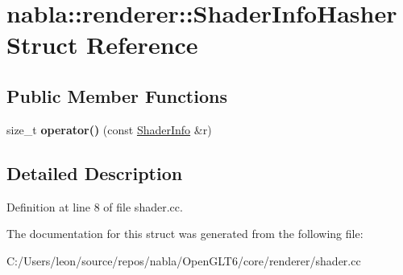 \hypertarget{structnabla_1_1renderer_1_1_shader_info_hasher}{}\section{nabla\+::renderer\+::Shader\+Info\+Hasher Struct Reference}
\label{structnabla_1_1renderer_1_1_shader_info_hasher}
\subsection*{Public Member Functions}
\begin{DoxyCompactItemize}
\item 
\mbox{\label{structnabla_1_1renderer_1_1_shader_info_hasher_ad5d2126367c75a07c97c5827234217a8}} 
size\+\_\+t {\bfseries operator()} (const \mbox{\hyperlink{structnabla_1_1renderer_1_1_shader_info}{Shader\+Info}} \&r)
\end{DoxyCompactItemize}


\subsection{Detailed Description}


Definition at line 8 of file shader.\+cc.



The documentation for this struct was generated from the following file\+:\begin{DoxyCompactItemize}
\item 
C\+:/\+Users/leon/source/repos/nabla/\+Open\+G\+L\+T6/core/renderer/shader.\+cc\end{DoxyCompactItemize}
